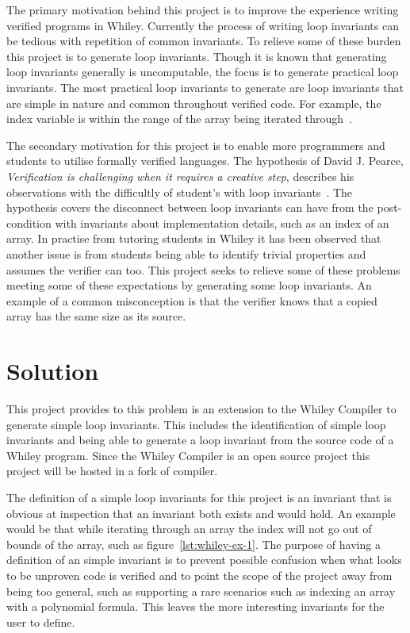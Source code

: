 The primary motivation behind this project is to improve the experience writing
verified programs in Whiley.
Currently the process of writing loop invariants can be tedious with 
repetition of common invariants.
To relieve some of these burden this project is to generate loop invariants.
Though it is known that generating loop invariants generally is uncomputable,
the focus is to generate practical loop invariants. 
The most practical loop invariants to generate are loop invariants that
are simple in nature and common throughout verified code.
For example, the index variable is within the range of the array being
iterated through~\cite{loop-patterns}.

The secondary motivation for this project is to enable more programmers and
students to utilise formally verified languages.
The hypothesis of David J. Pearce, \textit{Verification is challenging when it requires a creative step},
describes his observations with the difficultly of student's with loop invariants~\cite{spec-usability}.
The hypothesis covers the disconnect between loop invariants can have from the
post-condition with invariants about implementation details, such as an index
of an array.
In practise from tutoring students in Whiley
it has been observed that another issue is from students being able to identify trivial
properties and assumes the verifier can too.
This project seeks to relieve some of these problems meeting some of these
expectations by generating some loop invariants.
An example of a common misconception is that the verifier knows that a copied
array has the same size as its source.

\section{Solution}

This project provides to this problem is an extension to
the Whiley Compiler to generate simple loop invariants.
This includes the identification of simple loop invariants and being able
to generate a loop invariant from the source code of a Whiley program.
Since the Whiley Compiler is an open source project this project will be
hosted in a fork of compiler.

The definition of a simple loop invariants for this project is an invariant that is
obvious at inspection that an invariant both exists and would hold.
An example would be that while iterating through an array the index
will not go out of bounds of the array, such as figure~\ref{lst:whiley-ex-1}.
The purpose of having a definition of an simple invariant is to prevent
possible confusion when what looks to be unproven code is verified and to point
the scope of the project away from being too general, such as supporting
a rare scenarios such as indexing an array with a polynomial formula.
This leaves the more interesting invariants for the user to define.

